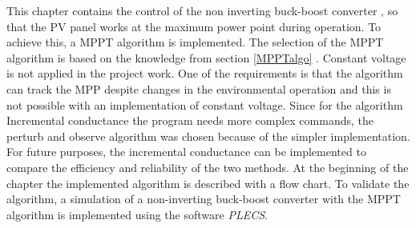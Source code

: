 This chapter contains the control of the non inverting buck-boost converter , so that the PV panel works at the maximum power point during operation. To achieve this, a MPPT algorithm is implemented.
The selection of the MPPT algorithm is based on the knowledge from section  \ref{MPPTalgo} .
Constant voltage is not applied in the project work. One of the requirements is that the algorithm can track the MPP despite changes in the environmental operation and this is not possible with an implementation of constant voltage. Since for the algorithm Incremental conductance the program needs more complex commands, the perturb and observe algorithm was chosen because of the simpler implementation. For future purposes, the incremental conductance can be implemented to compare the efficiency and reliability of the two methods.
At the beginning of the chapter the implemented algorithm is described with a flow chart. To validate the algorithm, a simulation of a non-inverting buck-boost converter with the MPPT algorithm is implemented using the software \textit{PLECS}. 
